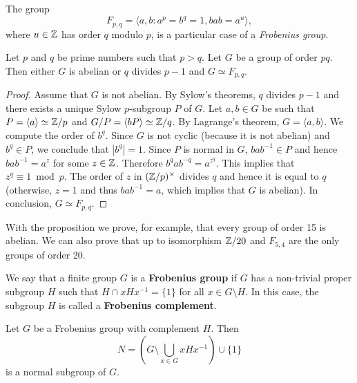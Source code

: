 The group   
\[
F_{p,q}=\langle a,b:a^p=b^q=1,bab=a^u\rangle,
\]
where $u\in\mathbb{Z}$ has order $q$ modulo $p$, 
is a particular case of a  
\emph{Frobenius group}. 

\begin{proposition}
    Let $p$ and $q$ be prime numbers such that $p>q$. Let  
    $G$ be a group of order $pq$. Then either $G$ is abelian or
    $q$ divides $p-1$ and 
    $G\simeq F_{p,q}$.
\end{proposition}

\begin{proof}
    Assume that $G$ is not abelian. By Sylow's theorems, 
    $q$ divides $p-1$ and there exists 
    a unique Sylow $p$-subgroup $P$ of $G$. Let $a,b\in G$ be such that 
    $P=\langle a\rangle\simeq\mathbb{Z}/p$ and $G/P=\langle bP\rangle\simeq\mathbb{Z}/q$. By Lagrange's theorem, 
    $G=\langle a,b\rangle$. We compute the order of $b^q$. Since 
    $G$ is not cyclic (because it is not abelian) and $b^q\in P$, 
    we conclude that $|b^q|=1$. 
    Since $P$ is normal in $G$, 
    $bab^{-1}\in P$ and hence $bab^{-1}=a^z$ for some $z\in\mathbb{Z}$. Therefore
    $b^qab^{-q}=a^{z^q}$. This implies that 
    $z^q\equiv1\bmod p$. The order of $z$ in $(\mathbb{Z}/p)^{\times}$ divides 
    $q$ and hence it is equal to $q$ (otherwise, $z=1$ and thus $bab^{-1}=a$, which implies
    that $G$ is abelian). In conclusion, 
    $G\simeq F_{p,q}$. 
\end{proof}

With the proposition we prove, for example, that 
every group of order 15 is abelian. We can also prove
that up to isomorphism $\mathbb{Z}/20$ and  
$F_{5,4}$ are the only groups of order 20. 

\begin{definition}
  We say that a finite group $G$ is a 
  \textbf{Frobenius group} if $G$ 
  has a non-trivial proper subgroup $H$ such that $H\cap
  xHx^{-1}=\{1\}$ for all $x\in G\setminus H$. In this case, the subgroup 
  $H$ is called a \textbf{Frobenius complement}.
\end{definition}

\begin{theorem}[Frobenius]
  \label{thm:Frobenius}
  Let $G$ be a Frobenius group with complement $H$. Then
  \[
	N=\left( G\setminus\bigcup_{x\in G}xHx^{-1}\right)\cup\{1\}
  \]
  is a normal subgroup of $G$.
\end{theorem}

